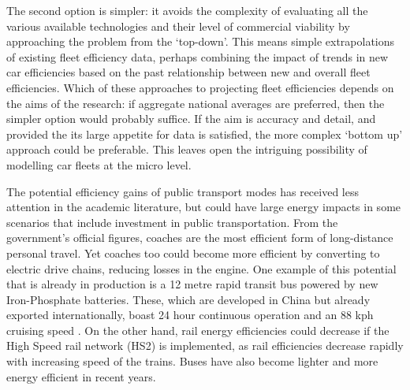 The second option is simpler: it avoids the complexity of
evaluating all the various available technologies and their level of
commercial viability by approaching the problem from the `top-down'. This
means simple extrapolations of existing fleet efficiency data, perhaps
combining the impact of trends in new car efficiencies based on the past
relationship between new and overall fleet efficiencies. Which of these
approaches to projecting fleet efficiencies depends on the aims of the research:
if aggregate national averages are preferred, then the simpler option would
probably suffice. If the aim is accuracy and detail, and provided the
its large appetite for data is satisfied, the more complex `bottom up'
approach could be preferable. This leaves open the intriguing possibility of
modelling car fleets at the micro level. 

The potential efficiency gains of public transport modes has received less
attention in the academic literature, but could have large energy impacts
in some scenarios that include investment in public transportation.
From the government's official figures, coaches are the most efficient
form of long-distance personal travel. Yet coaches too could become
more efficient by converting to electric drive chains, reducing losses
in the engine. One example of this potential that is already in production
is a 12 metre rapid transit bus powered by new Iron-Phosphate batteries.
These, which are developed in China but already exported internationally,
boast 24 hour continuous operation and an 88 kph cruising speed
\citep{BreakingTravelNews}. On the other hand, rail energy efficiencies could
decrease if the High Speed rail network (HS2) is implemented, as
rail efficiencies decrease rapidly with increasing speed of the trains.
Buses have also become lighter and more
energy efficient in recent years.


